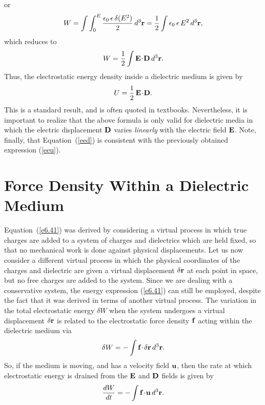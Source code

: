 or
\begin{equation}
W = \int \int_0^E \frac{\epsilon_0\,\epsilon \,\delta (E^2)}{2}\,d^3{\bf r}
= \frac{1}{2} \int \epsilon_0\,\epsilon \,E^2\,d^{3} {\bf r},
\end{equation}
which reduces to 
\begin{equation}\label{e6.41}
W = \frac{1}{2} \int {\bf E}\!\cdot\!{\bf D}\,d^3{\bf r}.
\end{equation}
Thus, the electrostatic energy density inside a dielectric medium is given by
\begin{equation}\label{eed}
U = \frac{1}{2}\, {\bf E}\!\cdot\!{\bf D}.
\end{equation}
This is a standard result, and is often quoted in textbooks. Nevertheless,
it is important to realize that the above formula is only valid for dielectric
media
in which
the electric displacement ${\bf D}$ varies {\em linearly}\/ with the
electric field ${\bf E}$. Note, finally, that Equation~(\ref{eed}) is consistent with
the previously obtained expression (\ref{eeu}).

\section{Force Density Within a Dielectric Medium}
Equation~(\ref{e6.41}) was derived by considering a virtual process in which
true charges are added to a system of charges and dielectrics which are
held fixed, so that no mechanical work is done against physical
displacements. Let us now consider a different virtual process in which
the physical coordinates of the charges and dielectric are given a virtual
displacement $\delta{\bf r}$ at each point in space, but no free charges
are added to the system. Since we are dealing with a conservative system,
the energy expression (\ref{e6.41}) can still be employed, despite the fact that
it was derived in terms of another virtual process. The variation in
the total electrostatic energy $\delta W$ when the system undergoes a virtual
displacement $\delta{\bf r}$ is related to the electrostatic 
force density ${\bf f}$
acting within the dielectric medium via
\begin{equation}
\delta W = - \int {\bf f}\!\cdot\! \delta {\bf r}\,d^3{\bf r}.
\end{equation}
So, if the medium  is moving, and has   a  velocity field ${\bf u}$, then 
the rate at which electrostatic energy is drained from the
${\bf E}$ and ${\bf D}$ fields is given
by
\begin{equation}\label{e5.64x}
\frac{dW}{dt} = - \int {\bf f}\!\cdot\! {\bf u}\,d^3{\bf r}.
\end{equation}

